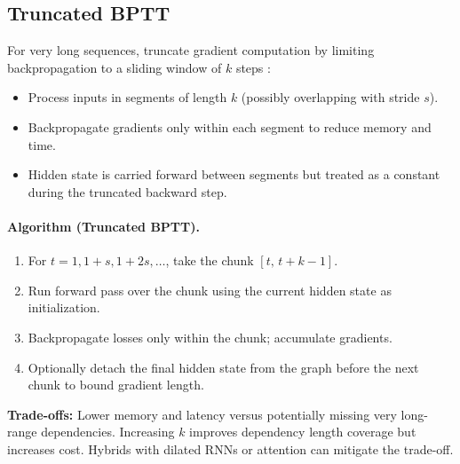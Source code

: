 \subsection{Truncated BPTT}

For very long sequences, truncate gradient computation by limiting backpropagation to a sliding window of $k$ steps \cite{GoodfellowEtAl2016}:
\begin{itemize}
    \item Process inputs in segments of length $k$ (possibly overlapping with stride $s$).
    \item Backpropagate gradients only within each segment to reduce memory and time.
    \item Hidden state is carried forward between segments but treated as a constant during the truncated backward step.
\end{itemize}

\paragraph{Algorithm (Truncated BPTT).}
\begin{enumerate}[nosep]
    \item For $t=1,1+s,1+2s,\dots$, take the chunk $[t,\, t+k-1]$.
    \item Run forward pass over the chunk using the current hidden state as initialization.
    \item Backpropagate losses only within the chunk; accumulate gradients.
    \item Optionally detach the final hidden state from the graph before the next chunk to bound gradient length.
\end{enumerate}

\textbf{Trade-offs:} Lower memory and latency versus potentially missing very long-range dependencies. Increasing $k$ improves dependency length coverage but increases cost. Hybrids with dilated RNNs or attention can mitigate the trade-off.

